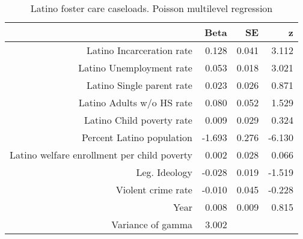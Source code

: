 \begin{table}[ht]
\centering
\caption{Latino foster care caseloads. Poisson multilevel regression} 
\label{l.c.tab}
\begin{tabular}{rrrr}
  \hline
 & Beta & SE & z \\ 
  \hline
Latino Incarceration rate & 0.128 & 0.041 & 3.112 \\ 
  Latino Unemployment rate & 0.053 & 0.018 & 3.021 \\ 
  Latino Single parent rate & 0.023 & 0.026 & 0.871 \\ 
  Latino Adults w/o HS rate & 0.080 & 0.052 & 1.529 \\ 
  Latino Child poverty rate & 0.009 & 0.029 & 0.324 \\ 
  Percent Latino population & -1.693 & 0.276 & -6.130 \\ 
  Latino welfare enrollment per child poverty & 0.002 & 0.028 & 0.066 \\ 
  Leg. Ideology & -0.028 & 0.019 & -1.519 \\ 
  Violent crime rate & -0.010 & 0.045 & -0.228 \\ 
  Year & 0.008 & 0.009 & 0.815 \\ 
  Variance of gamma & 3.002 &  &  \\ 
   \hline
\end{tabular}
\end{table}
